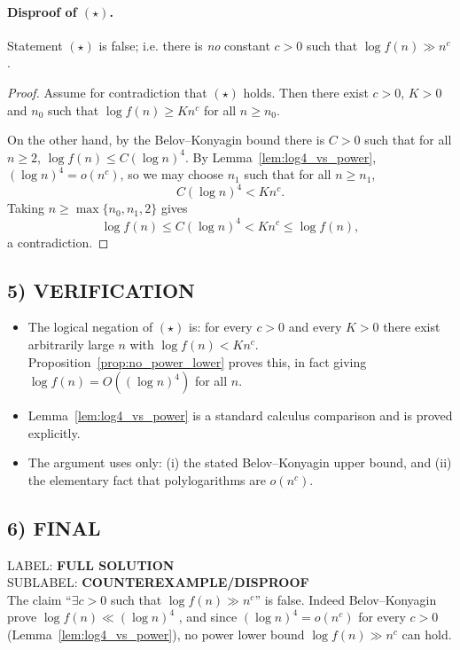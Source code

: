 \paragraph{Disproof of $(\star)$.}
\begin{proposition}\label{prop:no_power_lower}
Statement $(\star)$ is false; i.e. there is \emph{no} constant $c>0$ such that $\log f(n)\gg n^c$.
\end{proposition}
\begin{proof}
Assume for contradiction that $(\star)$ holds. Then there exist $c>0$, $K>0$ and $n_0$ such that
$\log f(n)\ge K n^c$ for all $n\ge n_0$.

On the other hand, by the Belov--Konyagin bound there is $C>0$ such that for all $n\ge 2$,
$\log f(n)\le C(\log n)^4$.
By Lemma~\ref{lem:log4_vs_power}, $(\log n)^4=o(n^c)$, so we may choose $n_1$ such that for all $n\ge n_1$,
\[C(\log n)^4 < K n^c.
\]
Taking $n\ge \max\{n_0,n_1,2\}$ gives
\[\log f(n)\le C(\log n)^4 < K n^c \le \log f(n),
\]
a contradiction.
\end{proof}

\subsection*{5) VERIFICATION}
\begin{itemize}[leftmargin=2.2em]
\item The logical negation of $(\star)$ is: for every $c>0$ and every $K>0$ there exist arbitrarily large $n$ with $\log f(n)<K n^c$. Proposition~\ref{prop:no_power_lower} proves this, in fact giving $\log f(n)=O((\log n)^4)$ for all $n$.
\item Lemma~\ref{lem:log4_vs_power} is a standard calculus comparison and is proved explicitly.
\item The argument uses only: (i) the stated Belov--Konyagin upper bound, and (ii) the elementary fact that polylogarithms are $o(n^c)$.
\end{itemize}

\subsection*{6) FINAL}
\noindent LABEL: \textbf{FULL SOLUTION}\\
\noindent SUBLABEL: \textbf{COUNTEREXAMPLE/DISPROOF}\\
The claim ``$\exists c>0$ such that $\log f(n)\gg n^c$'' is false.  Indeed Belov--Konyagin prove
$\log f(n)\ll(\log n)^4$ \cite{BeKo96}, and since $(\log n)^4=o(n^c)$ for every $c>0$ (Lemma~\ref{lem:log4_vs_power}), no power lower bound $\log f(n)\gg n^c$ can hold.

